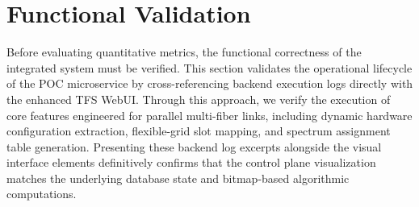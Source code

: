 \documentclass[12pt, a4paper, twoside, openright]{report}
\begin{document}
\section{Functional Validation}
Before evaluating quantitative metrics, the functional correctness of the integrated system must be verified. This section validates the operational lifecycle of the POC microservice by cross-referencing backend execution logs directly with the enhanced TFS WebUI. Through this approach, we verify the execution of core features engineered for parallel multi-fiber links, including dynamic hardware configuration extraction, flexible-grid slot mapping, and spectrum assignment table generation. Presenting these backend log excerpts alongside the visual interface elements definitively confirms that the control plane visualization matches the underlying database state and bitmap-based algorithmic computations.
\end{document}
